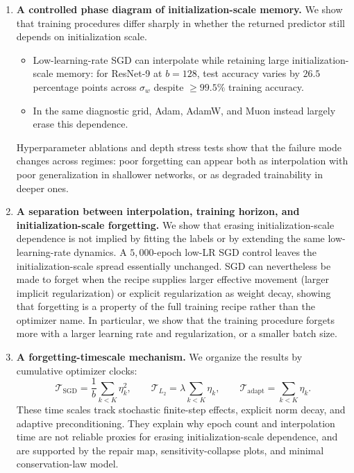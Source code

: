 \documentclass{article}
\newcommand{\sigw}{\sigma_w}
\begin{document}
\begin{enumerate}[leftmargin=1.4em,itemsep=0.15em]
    \item \textbf{A controlled phase diagram of initialization-scale memory.}
    We show that training procedures differ sharply in whether the returned
    predictor still depends on initialization scale. 
    \begin{itemize}
    \item Low-learning-rate SGD can interpolate while retaining large
    initialization-scale memory: for ResNet-9 at \(b=128\), test accuracy varies
    by \(26.5\) percentage points across \(\sigw\) despite \(\ge99.5\%\) training
    accuracy.
    \item In the same diagnostic grid, Adam, AdamW, and Muon instead largely erase this dependence.
    \end{itemize}
    Hyperparameter ablations and depth stress tests show that the failure mode changes across regimes: poor forgetting can appear both as interpolation with poor generalization in shallower networks, or as degraded trainability
    in deeper ones.

    \item \textbf{A separation between interpolation, training horizon, and initialization-scale forgetting.}
    We show that erasing initialization-scale dependence is not implied by
    fitting the labels or by extending the same low-learning-rate dynamics.
    A \(5{,}000\)-epoch low-LR SGD control leaves the initialization-scale
    spread essentially unchanged. SGD can nevertheless be made to forget when
    the recipe supplies larger effective movement (larger implicit regularization) or explicit regularization as weight decay, showing that forgetting is a property of the full training recipe rather than the optimizer name.
    In particular, we show that the training procedure forgets more with a larger learning rate and regularization, or a smaller batch size.

    \item \textbf{A forgetting-timescale mechanism.}
    We organize the results by cumulative optimizer clocks:
    \[
        \mathcal T_{\mathrm{SGD}}
        =
        \frac{1}{b}\sum_{k<K}\eta_k^2,
        \qquad
        \mathcal T_{L_2}
        =
        \lambda\sum_{k<K}\eta_k,
        \qquad
        \mathcal T_{\mathrm{adapt}}
        =
        \sum_{k<K}\eta_k .
    \]
    These time scales track stochastic finite-step effects, explicit norm decay, and adaptive preconditioning. They explain why epoch count and interpolation time are not reliable proxies for erasing initialization-scale dependence,
    and are supported by the repair map, sensitivity-collapse plots, and minimal conservation-law model.
\end{enumerate}
\end{document}
